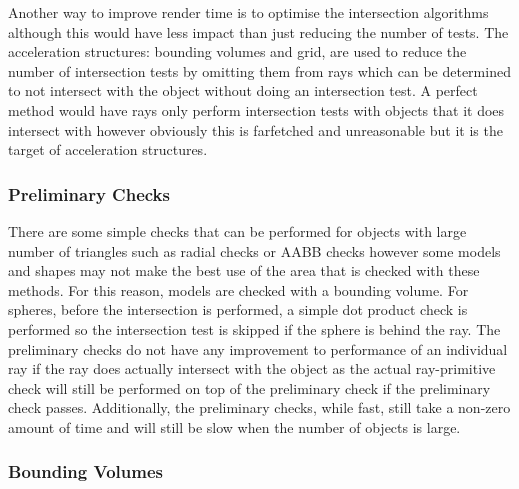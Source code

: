 \documentclass[final]{cmpreport}
\begin{document}
Another way to improve render time is to optimise the intersection algorithms although this would have less impact than just reducing the number of tests. The acceleration structures: bounding volumes and grid, are used to reduce the number of intersection tests by omitting them from rays which can be determined to not intersect with the object without doing an intersection test. A perfect method would have rays only perform intersection tests with objects that it does intersect with however obviously this is farfetched and unreasonable but it is the target of acceleration structures.

\subsubsection{Preliminary Checks}

There are some simple checks that can be performed for objects with large number of triangles such as radial checks or AABB checks however some models and shapes may not make the best use of the area that is checked with these methods. For this reason, models are checked with a bounding volume. For spheres, before the intersection is performed, a simple dot product check is performed so the intersection test is skipped if the sphere is behind the ray. The preliminary checks do not have any improvement to performance of an individual ray if the ray does actually intersect with the object as the actual ray-primitive check will still be performed on top of the preliminary check if the preliminary check passes. Additionally, the preliminary checks, while fast, still take a non-zero amount of time and will still be slow when the number of objects is large.

\subsubsection{Bounding Volumes}
\end{document}
